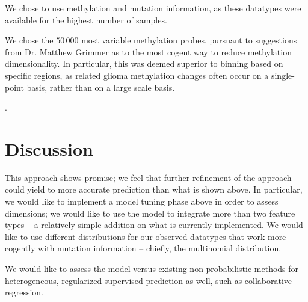 We chose to use methylation and mutation information, as these datatypes were available for the highest number of samples.

We chose the $50\,000$ most variable methylation probes, pursuant to suggestions from Dr. Matthew Grimmer as to the most cogent way to reduce methylation dimensionality. In particular, this was deemed superior to binning based on specific regions, as related glioma methylation changes often occur on a single-point basis, rather than on a large scale basis.

.


\section{Discussion}

This approach shows promise; we feel that further refinement of the approach could yield to more accurate prediction than what is shown above. In particular, we would like to implement a model tuning phase above in order to assess dimensions; we would like to use the model to integrate more than two feature types -- a relatively simple addition on what is currently implemented. We would like to use different distributions for our observed datatypes that work more cogently with mutation information -- chiefly, the multinomial distribution.

We would like to assess the model versus existing non-probabilistic methods for heterogeneous, regularized supervised prediction as well, such as collaborative regression. 
